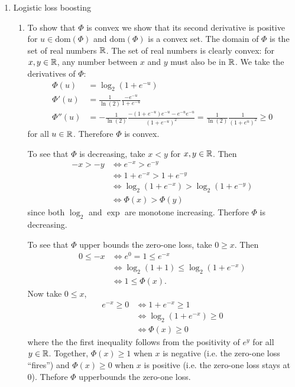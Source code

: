 \begin{enumerate}
\item Logistic loss boosting
\begin{enumerate}
    \item To show that $\Phi$ is convex we show that
    its second derivative is positive for
    $u \in \textrm{dom}(\Phi)$
    and $\textrm{dom}(\Phi)$ is a convex set.
    The domain of $\Phi$ is the set of real numbers $\operatorname*{\mathbb{R}}$.
    The set of real numbers is clearly convex:
    for $x, y \in \operatorname*{\mathbb{R}}$, any number between $x$ and $y$
    must also be in $\operatorname*{\mathbb{R}}$.
    We take the derivatives of $\Phi$:
    \begin{align}
        \Phi(u) &= \log_2(1+e^{-u}) \nonumber \\
        \Phi'(u) &= \frac{1}{\ln(2)}\frac{-e^{-u}}{1+e^{-u}}
        \nonumber \\
        \Phi''(u) &= -\frac{1}{\ln(2)}\frac
        {-(1+e^{-u})e^{-u} - e^{-u}e^{-u}}
        {(1+e^{-u})^2} = \frac{1}{\ln(2)}
        \frac{1}{(1+e^{u})^2} \geq 0
        \nonumber
    \end{align}
    for all $u \in \operatorname*{\mathbb{R}}$.
    Therefore $\Phi$ is convex.

    To see that $\Phi$ is decreasing,
    take $x<y$ for $x,y \in \operatorname*{\mathbb{R}}$.
    Then
    \begin{align}
        -x > -y &\Leftrightarrow
        e^{-x} > e^{-y} \nonumber \\
        &\Leftrightarrow
        1+e^{-x} > 1+e^{-y} \nonumber \\
        &\Leftrightarrow
        \log_2(1+e^{-x}) > \log_2(1+e^{-y})
        \nonumber \\
        &\Leftrightarrow
        \Phi(x) > \Phi(y)
        \nonumber
    \end{align}
    since both $\log_2$ and $\exp$ are monotone
    increasing.
    Therfore $\Phi$ is decreasing.

    To see that $\Phi$ upper bounds the
    zero-one loss, take $0\geq x$.
    Then
    \begin{align}
        0 \leq - x &\Leftrightarrow
        e^0 = 1 \leq e^{-x} \nonumber \\
        &\Leftrightarrow
        \log_2(1 + 1) \leq \log_2(1+e^{-x}) \nonumber \\
        &\Leftrightarrow
        1 \leq \Phi(x).
        \nonumber
    \end{align}
    Now take $0\leq x$,
    \begin{align}
        e^{-x} \geq 0 &\Leftrightarrow
        1 + e^{-x} \geq 1 \nonumber \\
        &\Leftrightarrow
        \log_2(1+e^{-x}) \geq 0 \nonumber \\
        &\Leftrightarrow
        \Phi(x) \geq 0
        \nonumber
    \end{align}
    where the the first inequality
    follows from the positivity of $e^{y}$
    for all $y\in \operatorname*{\mathbb{R}}$.
    Together, $\Phi(x) \geq 1$ when $x$ is negative
    (i.e. the zero-one loss ``fires'')
    and $\Phi(x) \geq 0$ when $x$ is positive
    (i.e. the zero-one loss stays at 0).
    Thefore $\Phi$ upperbounds the zero-one loss.


\end{enumerate}
\end{enumerate}
